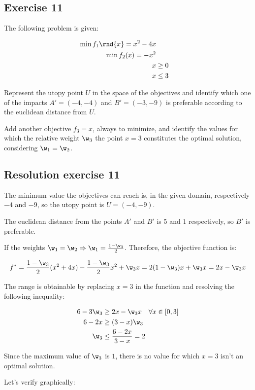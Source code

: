 \documentclass[\main/main.tex]{subfiles}
\begin{document}
\subsection{Exercise 11}
The following problem is given:

\begin{align*}
  \min f_1\rnd{x} = x^2 - 4x \\
  \min f_2(x) = -x^2         \\
  x & \geq 0                 \\
  x & \leq 3                 \\
\end{align*}


Represent the utopy point $U$ in the space of the objectives and identify which one of the impacts $A' = (-4, -4)$ and $B' = (-3, -9)$ is preferable according to the euclidean distance from $U$.

Add another objective $f_3 = x$, always to minimize, and identify the values for which the relative weight $\w_3$ the point $x = 3$ constitutes the optimal solution, considering $\w_1 = \w_2$.

\subsection{Resolution exercise 11}
The minimum value the objectives can reach is, in the given domain, respectively $-4$ and $-9$, so the utopy point is $U = (-4, -9)$.

The euclidean distance from the points $A'$ and $B'$ is $5$ and $1$ respectively, so $B'$ is preferable.

If the weights $\w_1 = \w_2 \Rightarrow \w_1 = \frac{1 - \w_3}{2}$. Therefore, the objective function is:

\[
  f^* = \frac{1 - \w_3}{2}(x^2+4x) - \frac{1 - \w_3}{2}x^2 + \w_3 x = 2(1 - \w_3)x + \w_3x = 2x - \w_3x
\]

The range is obtainable by replacing $x=3$ in the function and resolving the following inequality:

\begin{align*}
  6 - 3\w_3 & \geq 2x - \w_3x \quad \forall x \in [0,3] \\
  6 - 2x    & \geq (3-x)\w_3                            \\
  \w_3      & \leq \frac{6-2x}{3-x} = 2
\end{align*}

Since the maximum value of $\w_3$ is $1$, there is no value for which $x = 3$ isn't an optimal solution.

Let's verify graphically:

\begin{figure}

\end{figure}
\end{document}
